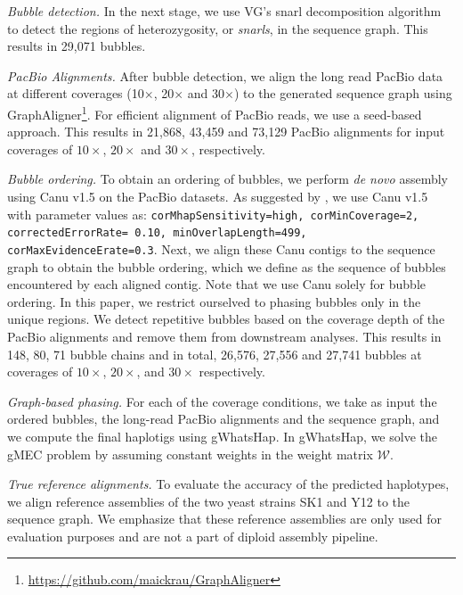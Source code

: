 \textit{Bubble detection.} In the next stage, we use VG's snarl decomposition algorithm to detect the regions of heterozygosity, or \textit{snarls}, in the sequence graph. This results in 29,071 bubbles.

\textit{PacBio Alignments.} After bubble detection, we align the long read PacBio data at different coverages (10$\times$, 20$\times$ and 30$\times$) to the generated sequence graph using GraphAligner\footnote{\url{https://github.com/maickrau/GraphAligner}}.
For efficient alignment of PacBio reads, we use a seed-based approach.
This results in 21,868, 43,459 and 73,129 PacBio alignments for input coverages of $10\times$, $20\times$ and $30\times$, respectively.

\textit{Bubble ordering.} To obtain an ordering of bubbles, we perform \textit{de novo} assembly using Canu v1.5 \citep{koren2017canu} on the PacBio datasets.
As suggested by \cite{giordano2017novo}, we use Canu v1.5 with parameter values as: \texttt{corMhapSensitivity=high, corMinCoverage=2, correctedErrorRate=
0.10, minOverlapLength=499,}\\
\texttt{corMaxEvidenceErate=0.3}. Next, we align these Canu contigs to the sequence graph to obtain the bubble ordering, which we define as the sequence of bubbles encountered by each aligned contig.
Note that we use Canu solely for bubble ordering.
In this paper, we restrict ourselved to phasing bubbles only in the unique regions.
We detect repetitive bubbles based on the coverage depth of the PacBio alignments and remove them from downstream analyses.
This results in 148, 80, 71 bubble chains and in total, 26,576, 27,556 and 27,741 bubbles at coverages of $10\times$, $20\times$, and $30\times$ respectively.

\textit{Graph-based phasing.} For each of the coverage conditions, we take as input the ordered bubbles, the long-read PacBio alignments and the sequence graph, and we compute the final haplotigs using gWhatsHap. 
In gWhatsHap, we solve the gMEC problem by assuming constant weights in the weight matrix $\mathcal{W}$.

\textit{True reference alignments.}
To evaluate the accuracy of the predicted haplotypes, we align reference assemblies of the two yeast strains SK1 and Y12 \citep{yue2017contrasting} to the sequence graph.
We emphasize that these reference assemblies are only used for evaluation purposes and are not a part of diploid assembly pipeline.

